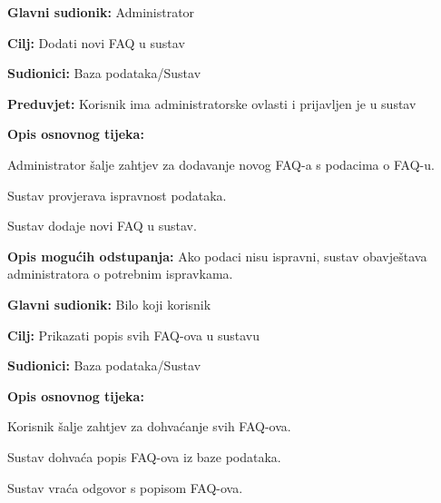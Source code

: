                 \noindent {}
					\begin{packed_item}
	
						\item \textbf{Glavni sudionik: }Administrator
						\item  \textbf{Cilj:} Dodati novi FAQ u sustav
						\item  \textbf{Sudionici:} Baza podataka/Sustav
						\item  \textbf{Preduvjet:} Korisnik ima administratorske ovlasti i prijavljen je u sustav
						\item  \textbf{Opis osnovnog tijeka:}
						
						\item[] \begin{packed_enum}
	
							\item Administrator šalje zahtjev za dodavanje novog FAQ-a s podacima o FAQ-u.
							\item Sustav provjerava ispravnost podataka.
                            \item Sustav dodaje novi FAQ u sustav.
	
						\end{packed_enum}
						
						\item  \textbf{Opis mogućih odstupanja:} Ako podaci nisu ispravni, sustav obavještava administratora o potrebnim ispravkama.
						
						
					\end{packed_item}

                \noindent {}
					\begin{packed_item}
	
						\item \textbf{Glavni sudionik: }Bilo koji korisnik
						\item  \textbf{Cilj:} Prikazati popis svih FAQ-ova u sustavu
						\item  \textbf{Sudionici:} Baza podataka/Sustav
						\item  \textbf{Opis osnovnog tijeka:}
						
						\item[] \begin{packed_enum}
	
							\item Korisnik šalje zahtjev za dohvaćanje svih FAQ-ova.
							\item Sustav dohvaća popis FAQ-ova iz baze podataka.
                            \item Sustav vraća odgovor s popisom FAQ-ova.
	
						\end{packed_enum}
						
						
					\end{packed_item}


